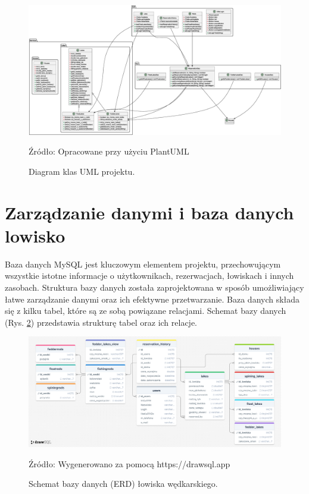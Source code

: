 \begin{figure}[H]
    \centering
    \includegraphics[width=1.1\linewidth]{figures/diagram.eps}
    \caption{Diagram klas UML projektu.}
    \label{fig:umldiagram}
    \small{Źródło: Opracowane przy użyciu PlantUML}
\end{figure}
\clearpage

\section{Zarządzanie danymi i baza danych lowisko}
\label{sec:baza_danych_nowe}
Baza danych MySQL jest kluczowym elementem projektu, przechowującym wszystkie istotne informacje o użytkownikach, rezerwacjach, łowiskach i innych zasobach. Struktura bazy danych została zaprojektowana w sposób umożliwiający łatwe zarządzanie danymi oraz ich efektywne przetwarzanie.
Baza danych składa się z kilku tabel, które są ze sobą powiązane relacjami. Schemat bazy danych (Rys. \ref{fig:erddiagram}) przedstawia strukturę tabel oraz ich relacje. 
\begin{figure}[H]
    \centering
    \includegraphics[width=\linewidth]{figures/dbd.eps}
    \caption{Schemat bazy danych (ERD) łowiska wędkarskiego.}
    \label{fig:erddiagram}
    \small{Źródło: Wygenerowano za pomocą https://drawsql.app}
\end{figure}
\clearpage

